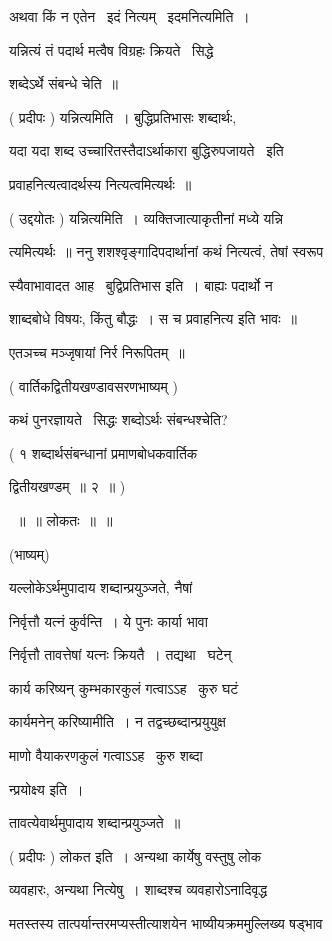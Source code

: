 \documentclass[11pt, openany]{book}
\begin{document}
अथवा किं न एतेन \textendash\ इदं नित्यम् \textendash\ इदमनित्यमिति~। 

यन्नित्यं तं पदार्थ मत्वैष विग्रहः क्रियते \textendash\ सिद्धे 

शब्देऽर्थे संबन्धे चेति~॥ 

( प्रदीपः ) यन्नित्यमिति~। बुद्धिप्रतिभासः शब्दार्थः, 

यदा यदा शब्द उच्चारितस्तैदाऽर्थाकारा बुद्धिरुपजायते \textendash\ इति 

प्रवाहनित्यत्वादर्थस्य नित्यत्वमित्यर्थः~॥ 

( उद्दयोतः ) यन्नित्यमिति~। व्यक्तिजात्याकृतीनां मध्ये यन्नि \textendash\ 

त्यमित्यर्थः~॥ ननु शशश्वृङ्गादिपदार्थानां कथं नित्यत्वं, तेषां स्वरूप \textendash\ 


स्यैवाभावादत आह \textendash\ बुद्विप्रतिभास इति~। बाह्यः पदार्थो न 

शाब्दबोधे विषयः, किंतु बौद्धः~। स च प्रवाहनित्य इति भावः~॥ 

एतञच्च मञ्जृषायां निर्र निरूपितम्~॥ 

( वार्तिकद्वितीयखण्डावसरणभाष्यम् ) 

कथं पुनरज्ञायते \textendash\ सिद्धः शब्दोऽर्थः संबन्धश्चेति? 

( १ शब्दार्थसंबन्धानां प्रमाणबोधकवार्तिक \textendash\ 

द्वितीयखण्डम्~॥ २~॥ ) 

~॥~॥ लोकतः~॥~॥ 

(भाष्यम्) 

यल्लोकेऽर्थमुपादाय शब्दान्प्रयुञ्जते, नैषां 

निर्वृत्तौ यत्नं कुर्वन्ति~। ये पुनः कार्या भावा 

निर्वृत्तौ तावत्तेषां यत्नः क्रियतै~। तद्यथा \textendash\ घटेन् 

कार्य करिष्यन् कुम्भकारकुलं गत्वाऽऽह \textendash\ कुरु घटं 

कार्यमनेन् करिष्यामीति~। न तद्वच्छब्दान्प्रयुयुक्ष \textendash\ 

माणो वैयाकरणकुलं गत्वाऽऽह \textendash\ कुरु शब्दा \textendash\ 

न्प्रयोक्ष्य इति~। 

तावत्येवार्थमुपादाय शब्दान्प्रयुञ्जते~॥ 

( प्रदीपः ) लोकत इति~। अन्यथा कार्येषु वस्तुषु लोक \textendash\ 

व्यवहारः, अन्यथा नित्येषु~। शाब्दश्च व्यवहारोऽनादिवृद्ध \textendash\ 



मतस्तस्य तात्पर्यान्तरमप्यस्तीत्याशयेन भाष्यीयक्रममुल्लिख्य षड्भाव \textendash\ 
\end{document}
